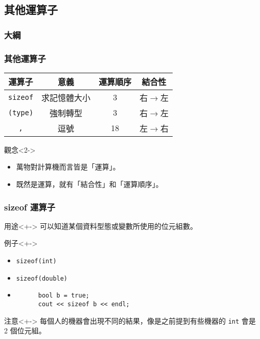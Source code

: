 \documentclass[utf8]{beamer}
\begin{document}
\begin{CJK}{UTF8}{bkai}
\section{其他運算子}
\begin{frame}
  \frametitle{大綱}
  \begin{multicols}{2}
    \tableofcontents[currentsection]
  \end{multicols}
\end{frame}

\begin{frame}[fragile]
  \frametitle{其他運算子}
  \begin{table}[h]
    \begin{tabular}{|c|c|c|c|}
    \hline
    運算子                & 意義       & 運算順序 & 結合性\\
    \hline
    \lstinline{sizeof}{} & 求記憶體大小 & 3      & \alert{右$\rightarrow$左}\\
    \hline
    \lstinline{(type)}{} & 強制轉型    & 3      & \alert{右$\rightarrow$左}\\
    \hline
    \lstinline{,}{}      & 逗號       & 18      & 左$\rightarrow$右\\
    \hline
    \end{tabular}
  \end{table}
  \begin{alertblock}{觀念}<2->
    \begin{itemize}
    \item 萬物對計算機而言皆是「\alert{運算}」。
    \item<3-> 既然是運算，就有「結合性」和「運算順序」。
    \end{itemize}
  \end{alertblock}
\end{frame}

\begin{frame}[fragile]
  \frametitle{sizeof 運算子}
  \begin{block}{用途}<+->
  可以知道某個\alert{資料型態}或\alert{變數}所使用的位元組數。
  \end{block}
  \begin{exampleblock}{例子}<+->
    \begin{itemize}
    \item \lstinline{sizeof(int)}{}
    \item<+-> \lstinline{sizeof(double)}{}
    \item<+->
      \begin{lstlisting}
      bool b = true;
      cout << sizeof b << endl;
      \end{lstlisting}
    \end{itemize}
  \end{exampleblock}
  \begin{alertblock}{注意}<+->
  每個人的機器會出現不同的結果，像是之前提到有些機器的 \lstinline{int}{} 會是 2 個位元組。
  \end{alertblock}
\end{frame}


\end{CJK}
\end{document}
